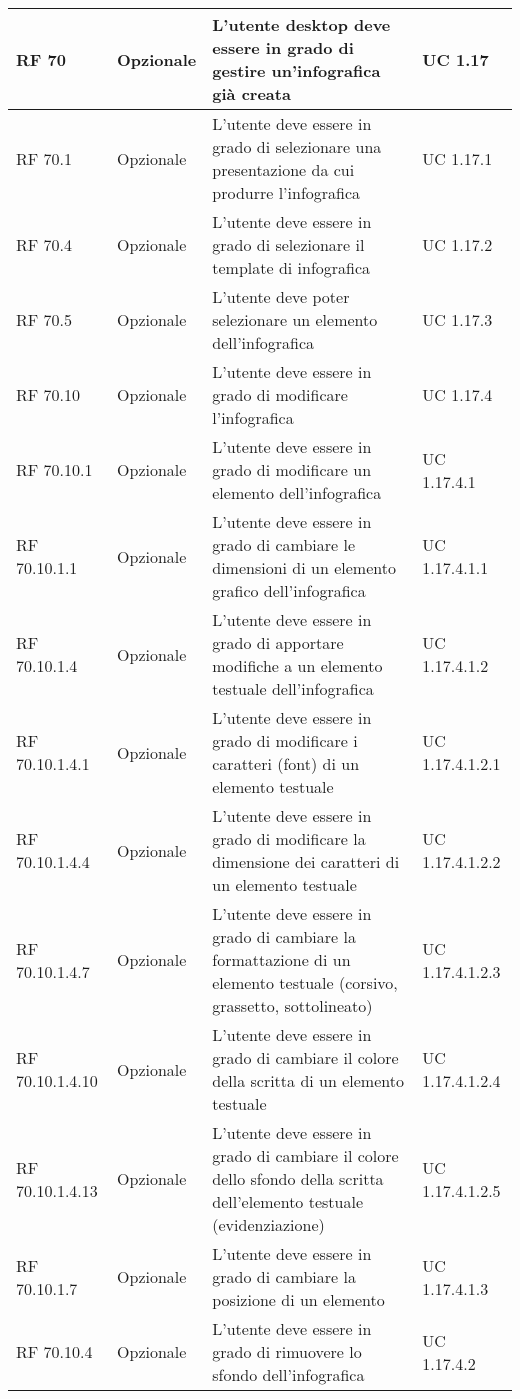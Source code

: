 {\begin{longtable} [c]{| p{2.5cm} | p{2.5cm} | p{6cm} |p{2.5cm}|}
RF 70 & Opzionale & L'utente desktop deve essere in grado di gestire un'infografica già creata & UC 1.17\\ 
 \hline 
RF 70.1 & Opzionale & L'utente deve essere in grado di selezionare una presentazione da cui produrre l'infografica & UC 1.17.1\\ 
 \hline 
RF 70.4 & Opzionale & L'utente deve essere in grado di selezionare il template di infografica & UC 1.17.2\\ 
 \hline 
RF 70.5 & Opzionale & L'utente deve poter selezionare un elemento dell'infografica & UC 1.17.3\\ 
 \hline 
RF 70.10 & Opzionale & L'utente deve essere in grado di modificare l'infografica & UC 1.17.4\\ 
 \hline 
RF 70.10.1 & Opzionale & L'utente deve essere in grado di modificare un elemento dell'infografica & UC 1.17.4.1\\ 
 \hline 
RF 70.10.1.1 & Opzionale & L'utente deve essere in grado di cambiare le dimensioni di un elemento grafico dell'infografica & UC 1.17.4.1.1\\ 
 \hline 
RF 70.10.1.4 & Opzionale & L'utente deve essere in grado di apportare modifiche a un elemento testuale dell'infografica & UC 1.17.4.1.2\\ 
 \hline 
RF 70.10.1.4.1 & Opzionale & L'utente deve essere in grado di modificare i caratteri (font) di un elemento testuale & UC 1.17.4.1.2.1\\ 
 \hline 
RF 70.10.1.4.4 & Opzionale & L'utente deve essere in grado di modificare la dimensione dei caratteri di un elemento testuale & UC 1.17.4.1.2.2\\ 
 \hline 
RF 70.10.1.4.7 & Opzionale & L'utente deve essere in grado di cambiare la formattazione di un elemento testuale (corsivo, grassetto, sottolineato) & UC 1.17.4.1.2.3\\ 
 \hline 
RF 70.10.1.4.10 & Opzionale & L'utente deve essere in grado di cambiare il colore della scritta di un elemento testuale & UC 1.17.4.1.2.4\\ 
 \hline 
RF 70.10.1.4.13 & Opzionale & L'utente deve essere in grado di cambiare il colore dello sfondo della scritta dell'elemento testuale (evidenziazione) & UC 1.17.4.1.2.5\\ 
 \hline 
RF 70.10.1.7 & Opzionale & L'utente deve essere in grado di cambiare la posizione di un elemento & UC 1.17.4.1.3\\ 
 \hline 
RF 70.10.4 & Opzionale & L'utente deve essere in grado di rimuovere lo sfondo dell'infografica & UC 1.17.4.2\\ 

\end{longtable}}
